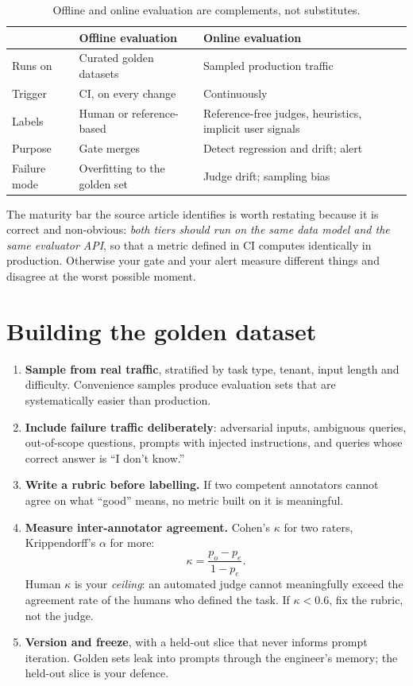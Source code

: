 \documentclass[11pt,twoside,openright]{book}
\theoremstyle{definition}
\theoremstyle{plain}
\theoremstyle{remark}
\newcommand{\term}[1]{\textbf{#1}}
\begin{document}
\begin{table}[H]
\centering\small
\renewcommand{\arraystretch}{1.3}
\begin{tabularx}{\textwidth}{@{}p{2.6cm} X X@{}}
\toprule
& \textbf{Offline evaluation} & \textbf{Online evaluation} \\
\midrule
Runs on & Curated golden datasets & Sampled production traffic \\
Trigger & CI, on every change & Continuously \\
Labels & Human or reference-based & Reference-free judges, heuristics, implicit user signals \\
Purpose & Gate merges & Detect regression and drift; alert \\
Failure mode & Overfitting to the golden set & Judge drift; sampling bias \\
\bottomrule
\end{tabularx}
\caption{Offline and online evaluation are complements, not substitutes.}
\end{table}

The maturity bar the source article identifies is worth restating because it is
correct and non-obvious: \emph{both tiers should run on the same data model and
the same evaluator API}, so that a metric defined in CI computes identically in
production. Otherwise your gate and your alert measure different things and
disagree at the worst possible moment.

\section{Building the golden dataset}

\begin{enumerate}[leftmargin=1.6em]
  \item \term{Sample from real traffic}, stratified by task type, tenant, input
        length and difficulty. Convenience samples produce evaluation sets that
        are systematically easier than production.
  \item \term{Include failure traffic deliberately}: adversarial inputs,
        ambiguous queries, out-of-scope questions, prompts with injected
        instructions, and queries whose correct answer is ``I don't know.''
  \item \term{Write a rubric before labelling.} If two competent annotators
        cannot agree on what ``good'' means, no metric built on it is meaningful.
  \item \term{Measure inter-annotator agreement.} Cohen's $\kappa$ for two
        raters, Krippendorff's $\alpha$ for more:
        \[
          \kappa = \frac{p_o - p_e}{1-p_e}.
        \]
        Human $\kappa$ is your \emph{ceiling}: an automated judge cannot
        meaningfully exceed the agreement rate of the humans who defined the
        task. If $\kappa < 0.6$, fix the rubric, not the judge.
  \item \term{Version and freeze}, with a held-out slice that never informs
        prompt iteration. Golden sets leak into prompts through the engineer's
        memory; the held-out slice is your defence.
\end{enumerate}
\end{document}

